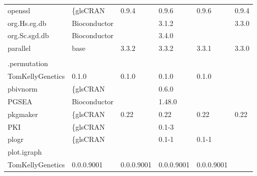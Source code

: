 \begin{longtable}{llllll}
\rowcolor{black!10}
openssl                       & \{gls{CRAN}                      & 0.9.4       & 0.9.6       & 0.9.6          & 0.9.4             \\
\rowcolor{black!5}
org.Hs.eg.db                  & Bioconductor              &             & 3.1.2       &                & 3.3.0              \\
\rowcolor{black!10}
org.Sc.sgd.db                 & Bioconductor              &             & 3.4.0       &                &                   \\
\rowcolor{black!5}
parallel                      & base                      & 3.3.2       & 3.3.2       & 3.3.1          & 3.3.0              \\
\rowcolor{black!10}
\begin{tabular}[c]{@{}l@{}}pathway.structure\\.permutation \end{tabular} & \begin{tabular}[c]{@{}l@{}}GitHub \\ TomKellyGenetics \end{tabular}  & 0.1.0       & 0.1.0       & 0.1.0          & 0.1.0             \\
\rowcolor{black!5}
pbivnorm                      & \{gls{CRAN}                      &             & 0.6.0       &                &                    \\
\rowcolor{black!10}
PGSEA                         & Bioconductor              &             & 1.48.0      &                &                   \\
\rowcolor{black!5}
pkgmaker                      & \{gls{CRAN}                      & 0.22        & 0.22        & 0.22           & 0.22               \\
\rowcolor{black!10}
PKI                           & \{gls{CRAN}                      &             & 0.1-3       &                &                   \\
\rowcolor{black!5}
plogr                         & \{gls{CRAN}                      &             & 0.1-1       & 0.1-1          &                    \\
\rowcolor{black!10}
plot.igraph                   & \begin{tabular}[c]{@{}l@{}}GitHub \\ TomKellyGenetics \end{tabular}  & 0.0.0.9001  & 0.0.0.9001  & 0.0.0.9001     & 0.0.0.9001        \\

\end{longtable}

